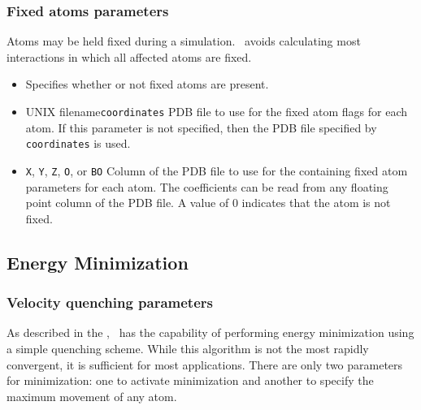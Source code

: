 \subsubsection{Fixed atoms parameters}

Atoms may be held fixed during a simulation.  \NAMD\ avoids calculating most interactions in which all affected atoms are fixed.

\begin{itemize}

\item
{}
{Specifies whether or not fixed atoms are present.} 

\item
{}%
{UNIX filename}{\verb!coordinates!}
{PDB file to use for the fixed atom flags for each atom.  
If this parameter is not specified, then 
the PDB file specified by \verb!coordinates! is used.}

\item
{}
{\verb!X!, \verb!Y!, \verb!Z!, \verb!O!, or \verb!B!}{\verb!O!} 
{Column of the PDB file to use for the containing fixed atom parameters for 
each atom.  The coefficients can be read from any 
floating point column of the PDB file.  
A value of 0 indicates that the atom is not fixed.}

\end{itemize}

\subsection{Energy Minimization}

\subsubsection{Velocity quenching parameters}

As described in the \PG, \NAMD\ has the capability
of performing energy minimization using a simple quenching
scheme.   While this algorithm is not the most rapidly convergent, it
is sufficient for most applications.  There are only two parameters
for minimization:  one to activate minimization and another
to specify the maximum movement of any atom.  

